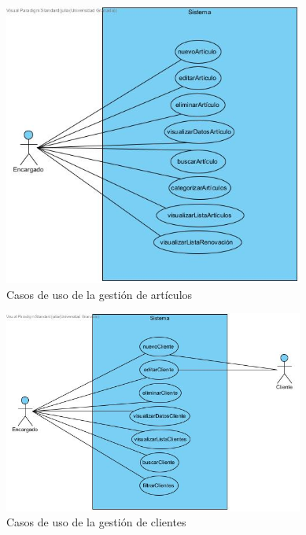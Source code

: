 \begin{figure}[H]
	\centering
	\includegraphics[width=0.88\textwidth]{imagenes/imagenesDiagramas/useCases/useCaseArticulos.jpg}
	\caption{Casos de uso de la gestión de artículos}
	\label{fig:usecaseArticulos}
\end{figure}

\begin{figure}[H]
	\centering
	\includegraphics[width=0.88\textwidth]{imagenes/imagenesDiagramas/useCases/useCaseCliente.jpg}
	\caption{Casos de uso de la gestión de clientes}
	\label{fig:usecaseClientes}
\end{figure}

